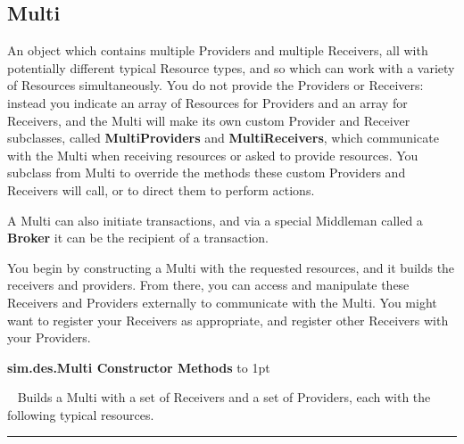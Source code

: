 \documentclass[twoside,10pt]{article}
\newcommand\class[1]{\index{Classes!{#1}}\textsf{#1}}
\newcommand*{\xfill}[1][0pt]{%
	\cleaders
		\hbox to 1pt{\hss
			\raisebox{#1}{\rule{1.2pt}{0.4pt}}%
			\hss}\hfill}
\newenvironment{methods}[1]{
\vspace{1.0em}\noindent\textsf{\textbf{#1 Methods}}\quad \xfill[0.5ex]
\vspace{-0.25em}
\begin{description}
\small}
{\end{description}\hrule\vspace{1.5em}}
\newcommand{\mthd}[1]{\item[{\sf #1}]~\newline}
\begin{document}
\subsection{Multi}

An object which contains multiple Providers and multiple Receivers, all with potentially different typical Resource types, and so which can work with a variety of Resources simultaneously.    You do not provide the Providers or Receivers: instead you indicate an array of Resources for Providers and an array for Receivers, and the Multi will make its own custom Provider and Receiver subclasses, called {\bf MultiProviders} and {\bf MultiReceivers}, which communicate with the Multi when receiving resources or asked to provide resources.  You subclass from Multi to override the methods these custom Providers and Receivers will call, or to direct them to perform actions.

A Multi can also initiate transactions, and via a special Middleman called a {\bf Broker} it can be the recipient of a transaction.

You begin by constructing a Multi with the requested resources, and it builds the receivers and providers.  From there, you can access and manipulate these Receivers and Providers externally to communicate with the Multi.  You might want to register your Receivers as appropriate, and register other Receivers with your Providers.

\begin{methods}{\class{sim.des.Multi} Constructor}
\mthd{public Multi(SimState state, Resource[] receiverResources, Resource[] providerResources)}
Builds a Multi with a set of Receivers and a set of Providers, each with the following typical resources.
 \end{methods}
\end{document}
